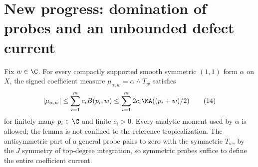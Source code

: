 \section{New progress: domination of probes and an unbounded defect current}
\begin{lemma}\label{dom}
Fix $w\in\C$. For every compactly supported smooth symmetric $(1,1)$ form
$\alpha$ on $X$, the signed coefficient measure
$\mu_{\alpha,w}=\alpha\wedge T_w$ satisfies
\[
 |\mu_{\alpha,w}|\le\sum_{i=1}^m c_i B(p_i,w)
 \le\sum_{i=1}^m2c_i\MA((p_i+w)/2)                         \tag{14}
\]
for finitely many $p_i\in\C$ and finite $c_i>0$.
Every analytic moment used by $\alpha$ is allowed; the lemma is not confined
to the reference tropicalization. The antisymmetric part of a general probe
pairs to zero with the symmetric $T_w$, by the $J$ symmetry of top-degree
integration, so symmetric probes suffice to define the entire coefficient
current.
\end{lemma}

